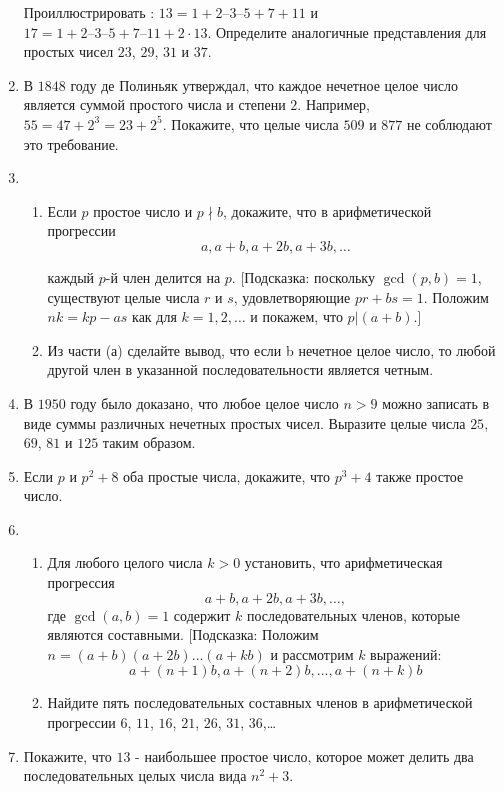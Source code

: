 \documentclass[11pt]{article}
\begin{document}
\begin{enumerate}
Проиллюстрировать :
$13 = 1 + 2 – 3 – 5 + 7 + 11$     и     $17 = 1 + 2 – 3 – 5 + 7 – 11 + 2 \cdot 13$.
Определите аналогичные представления для простых чисел $23$, $29$, $31$ и $37$.

\item	В $1848$ году де Полиньяк утверждал, что каждое нечетное целое число является суммой простого числа и степени $2$. Например, $55 = 47+2^3 = 23+2^5$. Покажите, что целые числа $509$ и $877$ не соблюдают это требование.

\item	
\begin{enumerate}
\item Если $p$ простое число и $p\nmid b$, докажите, что в арифметической прогрессии
\[
a,a+b,a+2b,a+3b,\ldots
\]
 
каждый $p$-й член делится на $p$. [Подсказка: поскольку $\gcd(p, b) = 1$, существуют    целые числа $r$ и $s$, удовлетворяющие $pr + bs = 1$. Положим $nk= kp - as$ как для $k = 1, 2, \ldots$ и покажем, что $p| (a+b)$.]

\item Из части (а) сделайте вывод, что если b нечетное целое число, то любой другой член в указанной последовательности является четным.
\end{enumerate}

\item В $1950$ году было доказано, что любое целое число $n > 9$ можно записать в виде суммы различных нечетных простых чисел. Выразите целые числа $25$, $69$, $81$ и $125$ таким образом.

\item Если $p$ и $p^2 + 8$ оба простые числа, докажите, что $p^3 + 4$ также простое число.

\item
\begin{enumerate}
\item Для любого целого числа $k> 0$ установить, что арифметическая прогрессия
\[
a+b,a+2b,a+3b,\ldots,
\]
где $\gcd(a, b) = 1$ содержит $k$ последовательных членов, которые являются составными. [Подсказка: Положим $n = (a+b)(a+2b) \ldots (a+kb)$ и рассмотрим $k$ выражений:
\[
a+(n+1)b,a+(n+2)b,\ldots,a+(n+k)b
\]
\item Найдите пять последовательных составных членов в арифметической прогрессии
$6$, $11$, $16$, $21$, $26$, $31$, $36$,\ldots 
\end{enumerate}

\item Покажите, что $13$ - наибольшее простое число, которое может делить два последовательных целых числа вида $n^2 + 3$.


\end{enumerate}
\end{document}
